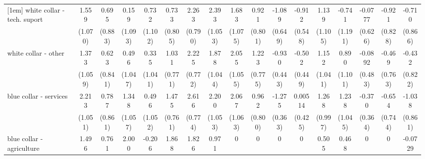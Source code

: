 {\begin{tabular}{l*{16}{c}}
[1em]
white collar - tech. suport&       1.559         &       0.695         &       0.159         &       0.732         &       0.733         &       2.263\sym{**} &       2.393\sym{*}  &       1.683         &       0.921         &      -1.089         &      -0.912         &       1.139         &      -0.741         &     -0.0777         &      -0.921         &      -0.710         \\
                    &     (1.070)         &     (0.883)         &     (1.093)         &     (1.102)         &     (0.805)         &     (0.790)         &     (1.053)         &     (1.075)         &     (0.801)         &     (0.649)         &     (0.548)         &     (1.105)         &     (1.191)         &     (0.626)         &     (0.828)         &     (0.866)         \\
[1em]
white collar - other&       1.373         &       0.623         &       0.496         &       0.335         &       1.031         &       2.225\sym{**} &       1.878         &       2.055         &       1.223         &      -0.930\sym{*}  &      -0.502         &       1.152         &       0.890         &     -0.0892         &      -0.469         &      -0.432         \\
                    &     (1.059)         &     (0.841)         &     (1.047)         &     (1.041)         &     (0.771)         &     (0.772)         &     (1.044)         &     (1.055)         &     (0.775)         &     (0.443)         &     (0.449)         &     (1.041)         &     (1.101)         &     (0.483)         &     (0.763)         &     (0.822)         \\
[1em]
blue collar - services&       2.213\sym{*}  &       0.787         &       1.348         &       0.496         &       1.475         &       2.616\sym{***}&       2.200\sym{*}  &       2.067         &       0.962         &      -1.275\sym{***}&     0.00514         &       1.268         &       1.238         &      -0.370         &      -0.654         &      -1.038         \\
                    &     (1.051)         &     (0.861)         &     (1.057)         &     (1.052)         &     (0.761)         &     (0.774)         &     (1.053)         &     (1.063)         &     (0.800)         &     (0.363)         &     (0.425)         &     (0.997)         &     (1.045)         &     (0.364)         &     (0.744)         &     (0.861)         \\
[1em]
blue collar - agriculture&       1.496         &       0.761         &       2.000         &      -0.206         &       1.868         &       1.826         &       0.971         &           0         &           0         &           0         &           0         &       0.505         &       0.468         &           0         &           0         &     -0.0729         \\

\end{tabular}}

